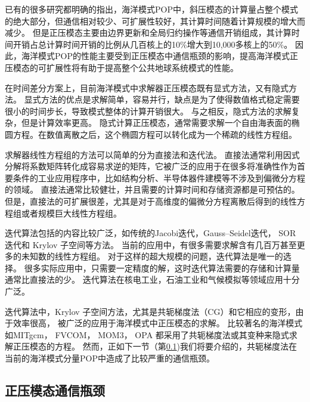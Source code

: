已有的很多研究都明确的指出，海洋模式POP中，斜压模态的计算量占整个模式的绝大部分，但通信相对较少、可扩展性较好，其计算时间随着计算规模的增大而减少。
但是正压模态主要由边界更新和全局归约操作等通信开销组成，其计算时间开销占总计算时间开销的比例从几百核上的10\%增大到10,000多核上的50\%\cite{pop05,stone2011cgpop,Worley:2011:PCE:2063384.2063457, dennis2012computational}。
因此，海洋模式POP的性能主要受到正压模态中通信瓶颈的影响，提高海洋模式正压模态的可扩展性将有助于提高整个公共地球系统模式的性能。

在时间差分方案上，目前海洋模式中求解器正压模态既有显式方法，又有隐式方法\cite{griffies2000developments}。 
显式方法的优点是求解简单，容易并行，缺点是为了使得数值格式稳定需要很小的时间步长，导致模式整体的计算开销很大。
与之相反，隐式方法的求解复杂，但是计算效率更高。 
隐式计算正压模态，通常需要求解一个自由海表面的椭圆方程。在数值离散之后，这个椭圆方程可以转化成为一个稀疏的线性方程组。

 
求解器线性方程组的方法可以简单的分为直接法和迭代法。
直接法通常利用因式分解将系数矩阵转化成容易求逆的矩阵，它被广泛的应用于在很多将准确性作为首要条件的工业应用程序中，比如结构分析、半导体器件建模等不涉及到偏微分方程的领域\cite{benzi2002preconditioning}。
直接法通常比较健壮，并且需要的计算时间和存储资源都是可预估的。
但是，直接法的可扩展很差，尤其是对于高维度的偏微分方程离散后得到的线性方程组或者规模巨大线性方程组。 

迭代算法包括的内容比较广泛，如传统的Jacobi迭代，Gauss–Seidel迭代， SOR 迭代和 Krylov 子空间等方法\cite{saad2003iterative,barrett1994templates}。
当前的应用中，有很多需要求解含有几百万甚至更多的未知数的线性方程组。 对于这样的超大规模的问题，迭代算法是唯一的选择。
很多实际应用中，只需要一定精度的解，这时迭代算法需要的存储和计算量通常比直接法的少。 
迭代算法在核电工业，石油工业和气候模拟等领域应用十分广泛。

迭代算法中，Krylov 子空间方法，尤其是共轭梯度法（CG）和它相应的变形，由于效率很高，
被广泛的应用于海洋模式中正压模态的求解。
比较著名的海洋模式如MITgcm\citep{adcroft2014mitgcm}， FVCOM\citep{lai2010nonhydrostatic}， MOM3\citep{pacanowsky1999mom3}， OPA \citep{madec1997ocean}
都采用了共轭梯度法或其变种来隐式求解正压模态的方程。
然而，正如下一节（第\ref{related:bottleneck})我们将要介绍的，共轭梯度法在当前的海洋模式分量POP中造成了比较严重的通信瓶颈\citep{Worley:2011:PCE:2063384.2063457}。 

 

\subsection{正压模态通信瓶颈}
\label{related:bottleneck}

